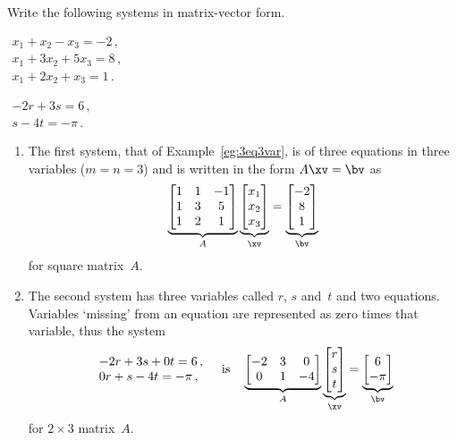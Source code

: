 \begin{example} \label{eg:matvecsys}
Write the following systems in matrix-vector form.
\begin{parts}
\item \(\begin{array}{l}
x_1+x_2-x_3=-2\,,\\
x_1+3x_2+5x_3=8\,,\\
x_1+2x_2+x_3=1\,.
\end{array}\)

\item \(\begin{array}{l} -2r+3s=6\,,\\s-4t=-\pi\,. \end{array}\)
\end{parts}
\begin{solution} 
\begin{enumerate}
\item The first system, that of Example~\ref{eg:3eq3var}, is of three equations in three variables (\(m=n=3\)) and is written in the form \(A\xv=\bv\) as
\begin{equation*}
\underbrace{\begin{bmatrix} 1&1&-1\\ 1&3&5\\1&2&1 \end{bmatrix}}_A
\underbrace{\begin{bmatrix} x_1\\x_2\\x_3 \end{bmatrix}}_\xv
=\underbrace{\begin{bmatrix} -2\\8\\1 \end{bmatrix}}_\bv 
\end{equation*}
for square matrix~\(A\).

\item The second system has three variables called \(r\), \(s\) and~\(t\) and two equations.
Variables `missing' from an equation are represented as zero times that variable, thus the system
\begin{equation*}
\begin{array}{l} -2r+3s+0t=6\,,\\0r+s-4t=-\pi\,, \end{array}
\quad\text{is}\quad
\underbrace{\begin{bmatrix} -2&3&0\\ 0&1&-4 \end{bmatrix}}_A
\underbrace{\begin{bmatrix} r\\s\\t \end{bmatrix}}_\xv
=\underbrace{\begin{bmatrix} 6\\-\pi \end{bmatrix}}_\bv 
\end{equation*}
for \(2\times3\) matrix~\(A\).
\end{enumerate}
\end{solution}
\end{example}




